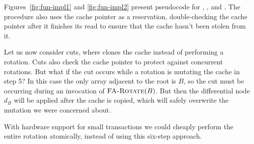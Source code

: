 Figures~\ref{fig:fun-impl1} and \ref{fig:fun-impl2} present pseudocode
for , , and
.  The  procedure also uses the
cache pointer as a reservation, double-checking the cache pointer
after it finishes its read to ensure that the cache hasn't been stolen
from it.

Let us now consider cuts, where  clones the cache
instead of performing a rotation.   Cuts also check the cache pointer
to protect against concurrent rotations.  But what if the cut occurs
while a rotation is mutating the cache in step 5?  In this case the
only array adjacent to the root is $B$, so the cut must be occurring
during an invocation of $\text{\sc FA-Rotate}(B)$.  But then the
differential node $d_B$ will be applied after the cache is copied,
which will safely overwrite the mutation we were concerned about.

With hardware support for small transactions \cite{HerlihyMo93}
we could cheaply perform the entire rotation atomically, instead of
using this six-step approach.







